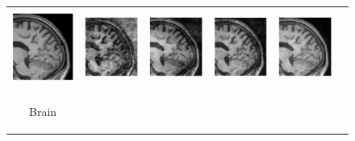 \documentclass[review]{elsarticle}
\begin{document}
\begin{figure}[H]
\begin{raggedleft}
\begin{tabular}{cccccc}
			\includegraphics[width=2.5cm,height=2.5cm]{include/grp2/factor6/022-Guys-0701-T1/022-Guys-0701-T1_images__zoom_50} &
			\includegraphics[width=2.5cm,height=2.5cm]{include/grp2/factor6/022-Guys-0701-T1/022-Guys-0701-T1_images__zeroPadding_zoom_50} & 
			\includegraphics[width=2.5cm,height=2.5cm]{include/grp2/factor6/022-Guys-0701-T1/022-Guys-0701-T1_images__CS_zoom_50} & \includegraphics[width=2.5cm,height=2.5cm]{include/grp2/factor6/022-Guys-0701-T1/022-Guys-0701-T1_images__IMCNNL2TUNE_zoom_50} & \includegraphics[width=2.5cm,height=2.5cm]{include/grp2/factor6/022-Guys-0701-T1/022-Guys-0701-T1_images__predict_zoom_50}
			
			\tabularnewline
			
			\multirow{2}{0.05cm}[1.4cm]{\begin{turn}{90} {\footnotesize Brain} \end{turn}} & 
			

\end{tabular}
\end{raggedleft}
\end{figure}
\end{document}
